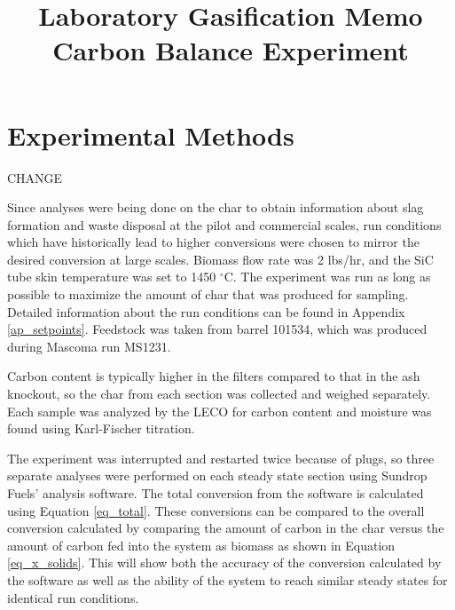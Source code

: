 \documentclass[11pt,twocolumn]{article}
\date{}
\title{Laboratory Gasification Memo\\Carbon Balance Experiment \vspace{-6ex}}
\begin{document}

\section*{Experimental Methods}

CHANGE

Since analyses were being done on the char to obtain information about slag formation and waste disposal at the pilot and commercial scales, run conditions which have historically lead to higher conversions were chosen to mirror the desired conversion at large scales.  Biomass flow rate was 2 lbs/hr, and the SiC tube skin temperature was set to 1450 $^\circ$C.  The experiment was run as long as possible to maximize the amount of char that was produced for sampling.  Detailed information about the run conditions can be found in Appendix \ref{ap_setpoints}.  Feedstock was taken from barrel 101534, which was produced during Mascoma run MS1231.

Carbon content is typically higher in the filters compared to that in the ash knockout, so the char from each section was collected and weighed separately.  Each sample was analyzed by the LECO for carbon content and moisture was found using Karl-Fischer titration.

The experiment was interrupted and restarted twice because of plugs, so three separate analyses were performed on each steady state section using Sundrop Fuels' analysis software.  The total conversion from the software is calculated using Equation \ref{eq_total}.  These conversions can be compared to the overall conversion calculated by comparing the amount of carbon in the char versus the amount of carbon fed into the system as biomass as shown in Equation \ref{eq_x_solids}.  This will show both the accuracy of the conversion calculated by the software as well as the ability of the system to reach similar steady states for identical run conditions.
\end{document}
